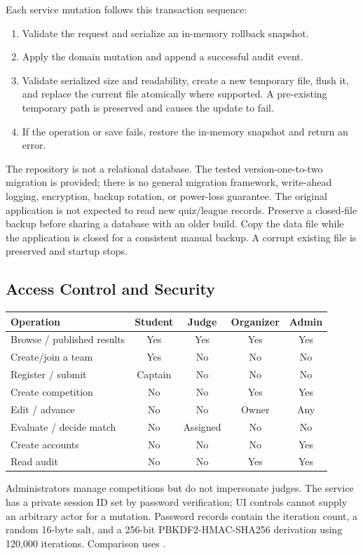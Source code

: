 \documentclass[12pt]{article}
\begin{document}
Each service mutation follows this transaction sequence:
\begin{enumerate}
\item Validate the request and serialize an in-memory rollback snapshot.
\item Apply the domain mutation and append a successful audit event.
\item Validate serialized size and readability, create a new temporary file, flush it, and replace the current file atomically where supported. A pre-existing temporary path is preserved and causes the update to fail.
\item If the operation or save fails, restore the in-memory snapshot and return an error.
\end{enumerate}
The repository is not a relational database. The tested version-one-to-two migration is provided; there is no general migration framework, write-ahead logging, encryption, backup rotation, or power-loss guarantee. The original application is not expected to read new quiz/league records. Preserve a closed-file backup before sharing a database with an older build. Copy the data file while the application is closed for a consistent manual backup. A corrupt existing file is preserved and startup stops.
\subsection{Access Control and Security}
\begin{tabularx}{\linewidth}{Ycccc}\toprule Operation & Student & Judge & Organizer & Admin\\\midrule
Browse / published results & Yes & Yes & Yes & Yes\\
Create/join a team & Yes & No & No & No\\
Register / submit & Captain & No & No & No\\
Create competition & No & No & Yes & Yes\\
Edit / advance & No & No & Owner & Any\\
Evaluate / decide match & No & Assigned & No & No\\
Create accounts & No & No & No & Yes\\
Read audit & No & No & Yes & Yes\\\bottomrule\end{tabularx}
Administrators manage competitions but do not impersonate judges. The service has a private session ID set by password verification; UI controls cannot supply an arbitrary actor for a mutation. Password records contain the iteration count, a random 16-byte salt, and a 256-bit PBKDF2-HMAC-SHA256 derivation using 120,000 iterations. Comparison uses .
\end{document}
